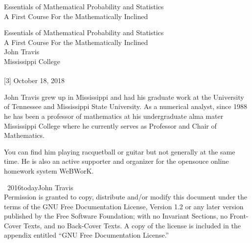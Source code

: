 \documentclass[10pt,]{book}
\numberwithin{equation}{section}
\begin{document}
\frontmatter
\thispagestyle{empty}
{\centering
\vspace*{0.28\textheight}
{\Huge Essentials of Mathematical Probability and Statistics}\\[2\baselineskip]
{\LARGE A First Course For the Mathematically Inclined}\\
}
\clearpage
\thispagestyle{empty}
\null%
\clearpage
\thispagestyle{empty}
{\centering
\vspace*{0.14\textheight}
{\Huge Essentials of Mathematical Probability and Statistics}\\[\baselineskip]
{\LARGE A First Course For the Mathematically Inclined}\\[3\baselineskip]
{\Large John Travis}\\[0.5\baselineskip]
{\Large Mississippi College}\\[3\baselineskip]
{\Large }\\[0.5\baselineskip]
[3\baselineskip]
{\Large October 18, 2018}\\}
\clearpage
\thispagestyle{empty}
\hypertarget{colophon-1}{}\noindent
\hypertarget{p-1}{}%
John Travis grew up in Mississippi and had his graduate work at the University of Tennessee and Mississippi State University. As a numerical analyst, since 1988 he has been a professor of mathematics at his undergraduate alma mater Mississippi College where he currently serves as Professor and Chair of Mathematics.%
\par
\hypertarget{p-2}{}%
You can find him playing racquetball or guitar but not generally at the same time. He is also an active supporter and organizer for the opensouce online homework system WeBWorK.%
\par
{}
\noindent\textcopyright\ 2016\textendash{}today\quad{}John Travis\\[0.5\baselineskip]
Permission is granted to copy, distribute and/or modify this document under the terms of the GNU Free Documentation License, Version 1.2 or any later version published by the Free Software Foundation; with no Invariant Sections, no Front-Cover Texts, and no Back-Cover Texts.  A copy of the license is included in the appendix entitled ``GNU Free Documentation License.''\par\medskip
{}
\null\clearpage
\end{document}
